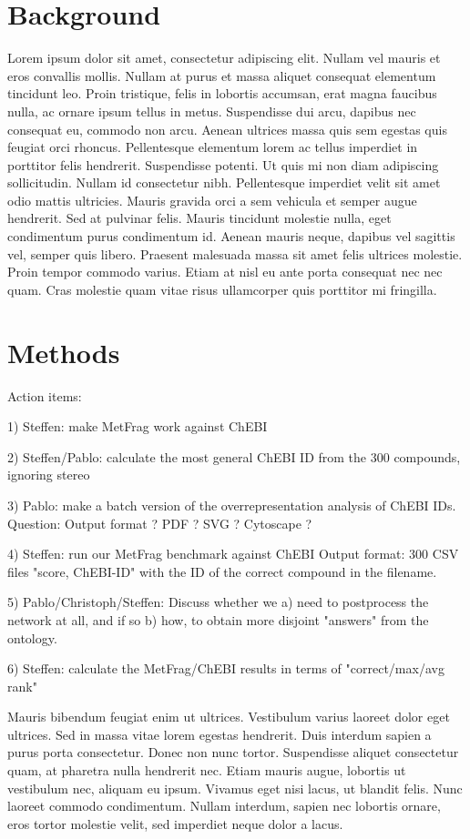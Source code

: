 \documentclass[10pt]{bmc_article}
\newenvironment{bmcformat}{\begin{raggedright}\baselineskip20pt\sloppy\setboolean{publ}{false}}{\end{raggedright}\baselineskip20pt\sloppy}
\begin{document}
\begin{bmcformat}
\section*{Background}

Lorem ipsum dolor sit amet, consectetur adipiscing elit. Nullam vel mauris et eros convallis mollis. Nullam at purus et massa aliquet consequat elementum tincidunt leo. Proin tristique, felis in lobortis accumsan, erat magna faucibus nulla, ac ornare ipsum tellus in metus. Suspendisse dui arcu, dapibus nec consequat eu, commodo non arcu. Aenean ultrices massa quis sem egestas quis feugiat orci rhoncus. Pellentesque elementum lorem ac tellus imperdiet in porttitor felis hendrerit. Suspendisse potenti. Ut quis mi non diam adipiscing sollicitudin. Nullam id consectetur nibh. Pellentesque imperdiet velit sit amet odio mattis ultricies. Mauris gravida orci a sem vehicula et semper augue hendrerit. Sed at pulvinar felis. Mauris tincidunt molestie nulla, eget condimentum purus condimentum id. Aenean mauris neque, dapibus vel sagittis vel, semper quis libero. Praesent malesuada massa sit amet felis ultrices molestie. Proin tempor commodo varius. Etiam at nisl eu ante porta consequat nec nec quam. Cras molestie quam vitae risus ullamcorper quis porttitor mi fringilla.

\section*{Methods}

Action items:

1) Steffen: make MetFrag work against ChEBI

2) Steffen/Pablo: calculate the most general ChEBI ID
 from the 300 compounds, ignoring stereo

3) Pablo: make a batch version of the overrepresentation analysis 
 of ChEBI IDs. Question: Output format ? PDF ? SVG ? Cytoscape ?

4) Steffen: run our MetFrag benchmark against ChEBI
 Output format: 300 CSV files "score, ChEBI-ID" 
 with the ID of the correct compound in the filename.

5) Pablo/Christoph/Steffen: 
 Discuss whether we a) need to postprocess the network at all, 
 and if so b) how, to obtain more disjoint "answers" 
 from the ontology.

6) Steffen: calculate the MetFrag/ChEBI results 
 in terms of "correct/max/avg rank"

Mauris bibendum feugiat enim ut ultrices. Vestibulum varius laoreet dolor eget ultrices. Sed in massa vitae lorem egestas hendrerit. Duis interdum sapien a purus porta consectetur. Donec non nunc tortor. Suspendisse aliquet consectetur quam, at pharetra nulla hendrerit nec. Etiam mauris augue, lobortis ut vestibulum nec, aliquam eu ipsum. Vivamus eget nisi lacus, ut blandit felis. Nunc laoreet commodo condimentum. Nullam interdum, sapien nec lobortis ornare, eros tortor molestie velit, sed imperdiet neque dolor a lacus.


\end{bmcformat}
\end{document}
